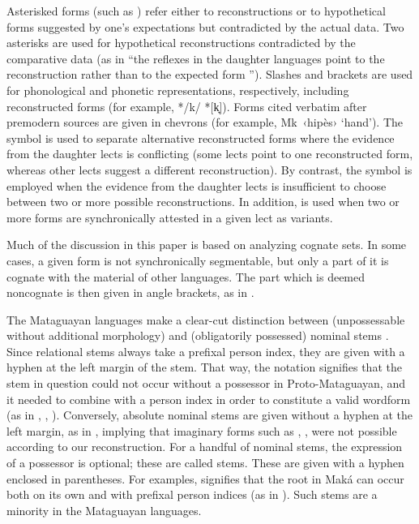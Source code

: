 Asterisked forms (such as ) refer either to reconstructions or to hypothetical forms suggested by one’s expectations but contradicted by the actual data. Two asterisks are used for hypothetical reconstructions contradicted by the comparative data (as in “the reflexes in the daughter languages point to the reconstruction  rather than to the expected form ”). Slashes and brackets are used for phonological and phonetic representations, respectively, including reconstructed forms (for example, */k/ *[k̟]). Forms cited verbatim after premodern sources are given in chevrons (for example, Mk~‹hipès› ‘hand’). The symbol \recvar is used to separate alternative reconstructed forms where the evidence from the daughter lects is conflicting (some lects point to one reconstructed form, whereas other lects suggest a different reconstruction). By contrast, the symbol \recind is employed when the evidence from the daughter lects is insufficient to choose between two or more possible reconstructions. In addition, {\recind} is used when two or more forms are synchronically attested in a given lect as variants.

Much of the discussion in this paper is based on analyzing cognate sets. In some cases, a given form is not synchronically segmentable, but only a part of it is cognate with the material of other languages. The part which is deemed noncognate is then given in angle brackets, as in .

The Mataguayan languages make a clear-cut distinction between  (unpossessable without additional morphology) and  (obligatorily possessed) nominal stems \citep{APS-AN-nd}. Since relational stems always take a prefixal person index, they are given with a hyphen at the left margin of the stem. That way, the notation  signifies that the stem in question could not occur without a possessor in Proto-Mataguayan, and it needed to combine with a person index in order to constitute a valid wordform (as in , , ). Conversely, absolute nominal stems are given without a hyphen at the left margin, as in , implying that imaginary forms such as , ,  were not possible according to our reconstruction. For a handful of nominal stems, the expression of a possessor is optional; these are called  stems. These are given with a hyphen enclosed in parentheses. For examples,  signifies that the root  in Maká can occur both on its own and with prefixal person indices (as in ). Such stems are a minority in the Mataguayan languages.

